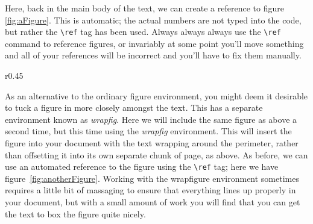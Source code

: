 Here, back in the main body of the text, we can create a reference to figure \ref{fig:aFigure}.  This is automatic; the actual numbers are not typed into the code, but rather the \texttt{\textbackslash ref} tag has been used.  Always always always use the \texttt{\textbackslash ref} command to reference figures, or invariably at some point you'll move something and all of your references will be incorrect and you'll have to fix them manually.

\begin{wrapfigure}[11]{r}{0.45\textwidth}
\centering
\vspace{-.1\baselineskip}
\caption[Another short-form caption]{A figure included using the wrapfig environment}
\label{fig:anotherFigure}
\end{wrapfigure}
As an alternative to the ordinary figure environment, you might deem it desirable to tuck a figure in more closely amongst the text.  This has a separate environment known as \emph{wrapfig}.  Here we will include the same figure as above a second time, but this time using the \emph{wrapfig} environment.  This will insert the figure into your document with the text wrapping around the perimeter, rather than offsetting it into its own separate chunk of page, as above.    As before, we can use an automated reference to the figure using the \texttt{\textbackslash ref} tag; here we have figure~\ref{fig:anotherFigure}.  Working with the wrapfigure environment sometimes requires a little bit of massaging to ensure that everything lines up properly in your document, but with a small amount of work  you will find that you can get the text to box the figure quite nicely.

